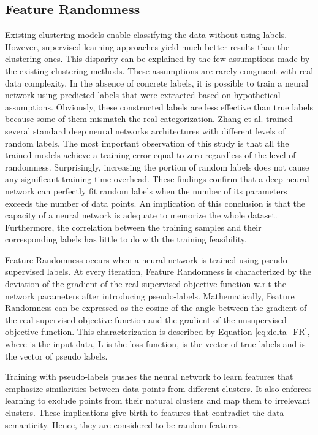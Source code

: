 \documentclass{article}
\begin{document}
\subsection{Feature Randomness}
Existing clustering models enable classifying the data without using labels. However, supervised learning approaches yield much better results than the clustering ones. This disparity can be explained by the few assumptions made by the existing clustering methods. These assumptions are rarely congruent with real data complexity. In the absence of concrete labels, it is possible to train a neural network using predicted labels that were extracted based on hypothetical assumptions. Obviously, these constructed labels are less effective than true labels because some of them mismatch the real categorization. Zhang et al. \cite{paper66} trained several standard deep neural networks architectures with different levels of random labels. The most important observation of this study is that all the trained models achieve a training error equal to zero regardless of the level of randomness. Surprisingly, increasing the portion of random labels does not cause any significant training time overhead. These findings confirm that a deep neural network can perfectly fit random labels when the number of its parameters exceeds the number of data points. An implication of this conclusion is that the capacity of a neural network is adequate to memorize the whole dataset. Furthermore, the correlation between the training samples and their corresponding labels has little to do with the training feasibility.

Feature Randomness occurs when a neural network is trained using pseudo-supervised labels.
At every iteration, Feature Randomness is characterized by the deviation of the gradient of the real supervised objective function w.r.t the network parameters  after introducing pseudo-labels. Mathematically, Feature Randomness can be expressed as the cosine of the angle between the gradient of the real supervised objective function and the gradient of the unsupervised objective function. This characterization  is described by Equation \ref{eq:delta_FR}, where  is the input data, L is the loss function,  is the vector of true labels and  is the vector of pseudo labels.



Training with pseudo-labels pushes the neural network to learn features that emphasize similarities between data points from different clusters. It also enforces learning to exclude points from their natural clusters and map them to irrelevant clusters. These implications give birth to features that contradict the data semanticity. Hence, they are considered to be random features. 
\end{document}
